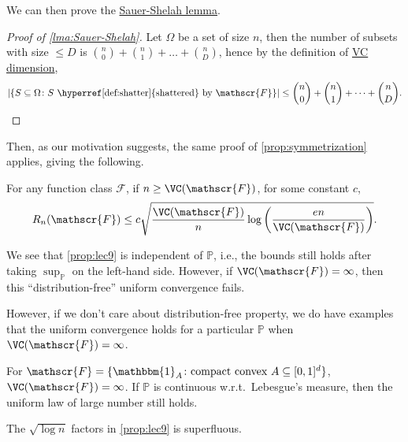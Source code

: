 We can then prove the \hyperref[lma:Sauer-Shelah]{Sauer-Shelah lemma}.

\begin{proof}[Proof of \autoref{lma:Sauer-Shelah}]
	Let \(\Omega \) be a set of size \(n\), then the number of subsets with size \(\leq D\) is \(\binom{n}{0} + \binom{n}{1} + \dots + \binom{n}{D}\), hence by the definition of \hyperref[def:VC-dimension]{VC dimension},
	\[
		\vert \{ S \subseteq \Omega \colon S \text{ \hyperref[def:shatter]{shattered} by } \mathscr{F} \} \vert
		\leq \binom{n}{0} + \binom{n}{1} + \dots + \binom{n}{D}.
	\]
\end{proof}

Then, as our motivation suggests, the same proof of \autoref{prop:symmetrization} applies, giving the following.

\begin{proposition}\label{prop:lec9}
	For any function class \(\mathscr{F} \), if \(n \geq \VC(\mathscr{F} ) \), for some constant \(c\),
	\[
		R_n(\mathscr{F} ) \leq c \sqrt{\frac{\VC(\mathscr{F} ) }{n} \log \left( \frac{en}{\VC(\mathscr{F} ) } \right) }.
	\]
\end{proposition}

\begin{remark}
	We see that \autoref{prop:lec9} is independent of \(\mathbb{P} \), i.e., the bounds still holds after taking \(\sup _{\mathbb{P} }\) on the left-hand side. However, if \(\VC(\mathscr{F} ) = \infty \), then this ``distribution-free'' uniform convergence fails.
\end{remark}

However, if we don't care about distribution-free property, we do have examples that the uniform convergence holds for a particular \(\mathbb{P} \) when \(\VC(\mathscr{F} ) = \infty \).

\begin{eg}
	For \(\mathscr{F} = \{ \mathbbm{1}_{A} \colon \text{compact convex } A \subseteq [0, 1]^d \} \), \(\VC(\mathscr{F} ) = \infty \). If \(\mathbb{P} \) is continuous w.r.t.\ Lebesgue's measure, then the uniform law of large number still holds.
\end{eg}

\begin{remark}\label{rmk:log-n-superfluous}
	The \(\sqrt{\log n} \) factors in \autoref{prop:lec9} is superfluous.
\end{remark}

